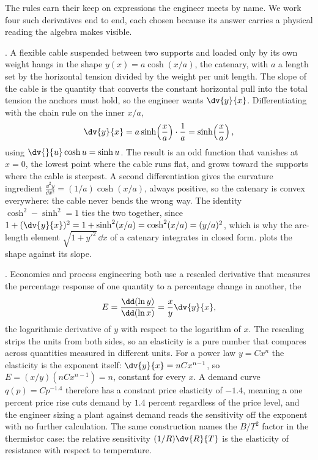 The rules earn their keep on expressions the engineer meets by name.
We work four such derivatives end to end, each chosen because its
answer carries a physical reading the algebra makes visible.

. A flexible cable suspended
between two supports and loaded only by its own weight hangs in the
shape $y(x) = a\cosh(x/a)$, the catenary, with $a$ a length set by the
horizontal tension divided by the weight per unit length. The slope of
the cable is the quantity that converts the constant horizontal pull
into the total tension the anchors must hold, so the engineer wants
$\dv{y}{x}$. Differentiating with the chain rule on the inner $x/a$,
\[
\dv{y}{x} = a\sinh\!\left(\frac{x}{a}\right)\cdot\frac{1}{a} =
\sinh\!\left(\frac{x}{a}\right),
\]
using $\dv{}{u}\cosh u = \sinh u$. The result is an odd function that
vanishes at $x = 0$, the lowest point where the cable runs flat, and
grows toward the supports where the cable is steepest. A second
differentiation gives the curvature ingredient
$\frac{\dd^{2} y}{\dd x^{2}} = (1/a)\cosh(x/a)$, always positive, so
the catenary is convex everywhere: the cable never bends the wrong way.
The identity $\cosh^{2} - \sinh^{2} = 1$ ties the two together, since
$1 + (\dv{y}{x})^{2} = 1 + \sinh^{2}(x/a) = \cosh^{2}(x/a) = (y/a)^{2}$,
which is why the arc-length element $\sqrt{1 + y'^{2}}\,\dd x$ of a
catenary integrates in closed form. 
plots the shape against its slope.



. Economics and
process engineering both use a rescaled derivative that measures the
percentage response of one quantity to a percentage change in another,
the 
\[
E = \frac{\dd(\ln y)}{\dd(\ln x)} = \frac{x}{y}\dv{y}{x},
\]
the logarithmic derivative of $y$ with respect to the logarithm of
$x$. The rescaling strips the units from both sides, so an elasticity
is a pure number that compares across quantities measured in different
units. For a power law $y = C x^{n}$ the elasticity is the exponent
itself: $\dv{y}{x} = n C x^{n-1}$, so $E = (x/y)(n C x^{n-1}) = n$,
constant for every $x$. A demand curve $q(p) = C p^{-1.4}$ therefore
has a constant price elasticity of $-1.4$, meaning a one percent price
rise cuts demand by $1.4$ percent regardless of the price level, and
the engineer sizing a plant against demand reads the sensitivity off
the exponent with no further calculation. The same construction names
the $B/T^{2}$ factor in the thermistor case: the relative sensitivity
$(1/R)\dv{R}{T}$ is the elasticity of resistance with respect to
temperature.

